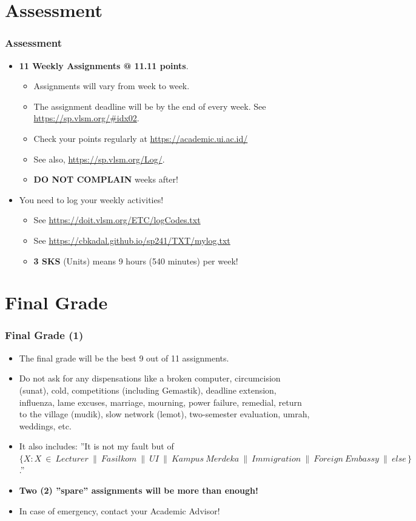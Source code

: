 \documentclass[aspectratio=169, xcolor=table, notheorems, hyperref={pdfpagelabels=false}]{beamer}
\begin{document}
\section{Assessment}
\begin{frame}
\frametitle{Assessment}

\begin{itemize}
\item \textbf{11 Weekly Assignments @ 11.11 points}.
\begin{itemize}
\item Assignments will vary from week to week.
\item The assignment deadline will be by the end of every week.
See \url{https://sp.vlsm.org/\#idx02}.
\item Check your points regularly at \url{https://academic.ui.ac.id/}
\item See also, \url{https://sp.vlsm.org/Log/}.
\item \textbf{DO NOT COMPLAIN} weeks after!
\end{itemize}
\item You need to log your weekly activities!
\begin{itemize}
\item See \url{https://doit.vlsm.org/ETC/logCodes.txt}
\item See \url{https://cbkadal.github.io/sp241/TXT/mylog.txt}
\item \textbf{3 SKS} (Units) means 9 hours (540 minutes) per week!
\end{itemize}
\end{itemize}

\end{frame}

\section{Final Grade}
\begin{frame}
\frametitle{Final Grade (1)}

\begin{itemize}
\item The final grade will be the best 9 out of 11 assignments.
\item Do not ask for any dispensations like a broken computer, circumcision (sunat), cold, competitions 
      (including Gemastik), deadline extension, influenza, lame excuses, marriage, mourning, 
      power failure, remedial, return to the village (mudik), slow network (lemot), two-semester evaluation, umrah,
      weddings, etc. 
\item It also includes: ''It is not my fault but of $\{ X\!: X\ \in\ Lecturer\ \parallel\ Fasilkom\ 
      \parallel\ UI\ \parallel\ Kampus\ Merdeka\ \parallel\ Immigration\ \parallel\ Foreign\ Embassy\ \parallel\ 
      else\, \}$.''
\item \textbf{Two (2) ''spare'' assignments will be more than enough!}
\item In case of emergency, contact your Academic Advisor!
\end{itemize}
\end{frame}
\end{document}
